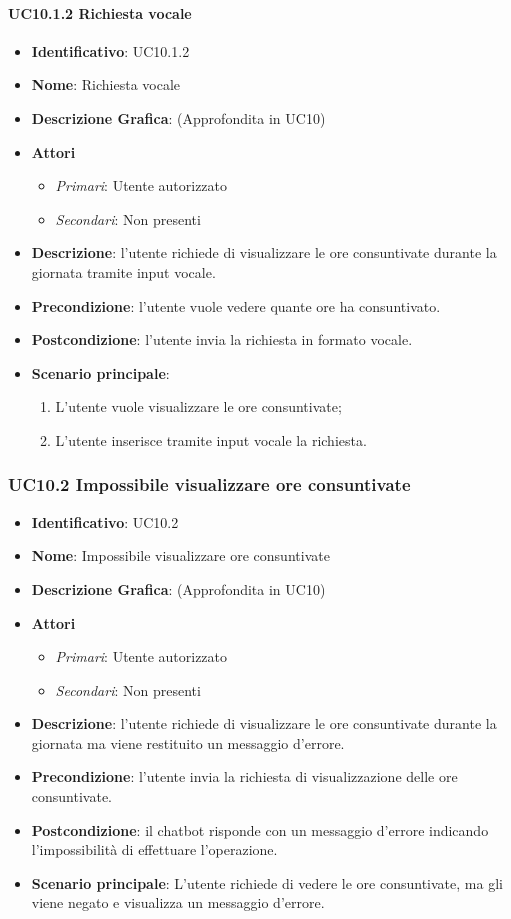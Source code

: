 \paragraph{UC10.1.2 Richiesta vocale}
\begin{itemize}
	\item \textbf{Identificativo}: UC10.1.2
	\item \textbf{Nome}: Richiesta vocale
	\item \textbf{Descrizione Grafica}: (Approfondita in UC10)
	\item \textbf{Attori}
	\begin{itemize}
		\item \textit{Primari}: Utente autorizzato
		\item \textit{Secondari}: Non presenti
	\end{itemize}
	\item \textbf{Descrizione}: l'utente richiede di visualizzare le ore consuntivate durante la giornata tramite input vocale.
	\item \textbf{Precondizione}: l'utente vuole vedere quante ore ha consuntivato.
	\item \textbf{Postcondizione}: l'utente invia la richiesta in formato vocale.
	\item \textbf{Scenario principale}: 
	\begin{enumerate}
		\item L'utente vuole visualizzare le ore consuntivate;
		\item L'utente inserisce tramite input vocale la richiesta.
	\end{enumerate}
\end{itemize}

\subsubsection{UC10.2 Impossibile visualizzare ore consuntivate}
\begin{itemize}
	\item \textbf{Identificativo}: UC10.2
	\item \textbf{Nome}: Impossibile visualizzare ore consuntivate
	\item \textbf{Descrizione Grafica}: (Approfondita in UC10)
	\item \textbf{Attori}
	\begin{itemize}
		\item \textit{Primari}: Utente autorizzato
		\item \textit{Secondari}: Non presenti
	\end{itemize}
	\item \textbf{Descrizione}: l'utente richiede di visualizzare le ore consuntivate durante la giornata ma viene restituito un messaggio d'errore.
	\item \textbf{Precondizione}: l'utente invia la richiesta di visualizzazione delle ore consuntivate.
	\item \textbf{Postcondizione}: il chatbot risponde con un messaggio d'errore indicando l'impossibilità di effettuare l'operazione.
	\item \textbf{Scenario principale}: L'utente richiede di vedere le ore consuntivate, ma gli viene negato e visualizza un messaggio d'errore.
\end{itemize}